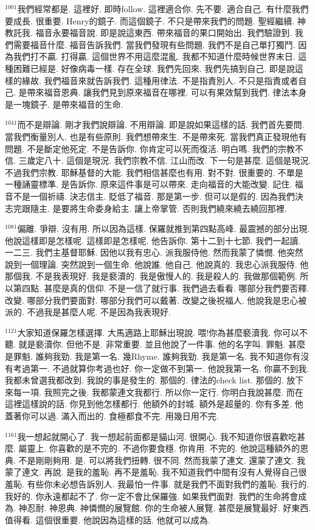 \documentclass{book}
\begin{document}
$^{1001}$我們經常都是.
這裡好.
即時follow.
這裡適合你.
先不要.
適合自己.
有什麼我們要成長.
很重要.
Henry的鏡子.
而這個鏡子.
不只是帶來我們的問題.
聖經繼續.
神教託我.
福音永要福音說.
即是說這東西.
帶來福音的果口開始出.
我們驗證到.
我們需要福音什麼.
福音告訴我們.
當我們發現有些問題.
我們不是自己單打獨鬥.
因為我們打不贏.
打得贏.
這個世界不用這麼混亂.
我都不知道什麼時候世界末日.
這種困難已經是.
好像病毒一樣.
存在全球.
我們先回來.
我們先搞到自己.
即是說這樣的緣故.
我們福音來就告訴我們.
這種用律法.
不是指責別人.
不只是指責或者自己.
是帶來福音恩典.
讓我們見到原來福音在哪裡.
可以有果效幫到我們.
律法本身是一塊鏡子.
是帶來福音的生命.

$^{1041}$而不是辯論.
剛才我們說辯論.
不用辯論.
即是說如果這樣的話.
我們首先要問.
當我們衡量別人.
也是有些原則.
我們想帶來生.
不是帶來死.
當我們真正發現他有問題.
不是斷定他死定.
不是告訴你.
你肯定可以死而復活.
明白嗎.
我們的宗教不信.
三歲定八十.
這個是現況.
我們宗教不信.
江山而改.
下一句是甚麼.
這個是現況.
不過我們宗教.
耶穌基督的大能.
我們相信甚麼也有用.
對不對.
很重要的.
不單是一種誦靈標準.
是告訴你.
原來這件事是可以帶來.
走向福音的大能改變.
記住.
福音不是一個祈禱.
決志信主.
貶低了福音.
那是第一步.
但可以是假的.
因為我們決志完跟隨主.
是要將生命委身給主.
讓上帝掌管.
否則我們繞來繞去繞回那裡.

$^{1081}$偏離.
爭辯.
沒有用.
所以因為這樣.
保羅就推到第四點高峰.
最震撼的部分出現.
他說這樣即是怎樣呢.
這樣即是怎樣呢.
他告訴你.
第十二到十七節.
我們一起讀.
一二三.
我們主基督耶穌.
因他以我有忠心.
派我服侍他.
然而我蒙了憐憫.
他突然說到一個理論.
突然說到一個生命.
他說誰.
他自己.
他說真的.
我忠心派我服侍.
他那個我.
不是我表現好.
我是褻瀆的.
我是傲慢人的.
我是殺人的.
我做那個範例.
所以第四點.
甚麼是真的信仰.
不是一信了就行事.
我們過去看看.
哪部分我們要否釋.
改變.
哪部分我們要面對.
哪部分我們可以戴著.
改變之後祝福人.
他說我是忠心被派的.
不過我是甚麼人呢.
不是因為我表現好.

$^{1121}$大家知道保羅怎樣選擇.
大馬適路上耶穌出現說.
喂!你為甚麼褻瀆我.
你可以不聽.
就是褻瀆你.
但他不是.
非常重要.
並且他說了一件事.
他的名字叫.
罪魁.
甚麼是罪魁.
誰夠我勁.
我是第一名.
幾Rhyme.
誰夠我勁.
我是第一名.
我不知道你有沒有考過第一.
不過就算你考過也好.
你一定做不到第一.
他說我第一名.
你贏不到我.
我都未曾選我都改到.
我說的事是發生的.
那個的.
律法的check list.
那個的.
放下來每一項.
我照完之後.
我都蒙連文我都行.
所以你一定行.
你明白我說甚麼.
而在這裡這樣說的話.
你見到他怎樣都行.
他額外的封城.
額外是超量的.
你有多差.
他蓋著你可以過.
滿入而出的.
食極都食不完.
用幾日用不完.

$^{1161}$我一想起就開心了.
我一想起前面都是貓山河.
很開心.
我不知道你很喜歡吃甚麼.
屬靈上.
你喜歡的是不完的.
不過你要食穩.
你肯用.
不完的.
他說這種額外的恩典.
不是剛剛夠用.
是.
可以將我們扭轉.
很不同.
然而我蒙了連文.
還蒙了連文.
我蒙了連文.
再說.
是我的羞恥.
再不是羞恥.
我不知道我們中間有沒有人覺得自己很羞恥.
有些你未必想告訴別人.
我最怕一件事.
就是我們不面對我們的羞恥.
我行的.
我好的.
你永遠都起不了.
你一定不會比保羅強.
如果我們面對.
我們的生命將會成為.
神忍耐.
神恩典.
神憐憫的展覽館.
你的生命被人展覽.
甚麼是展覽最好.
好東西.
值得看.
這個很重要.
他說因為這樣的話.
他就可以成為.
\end{document}

